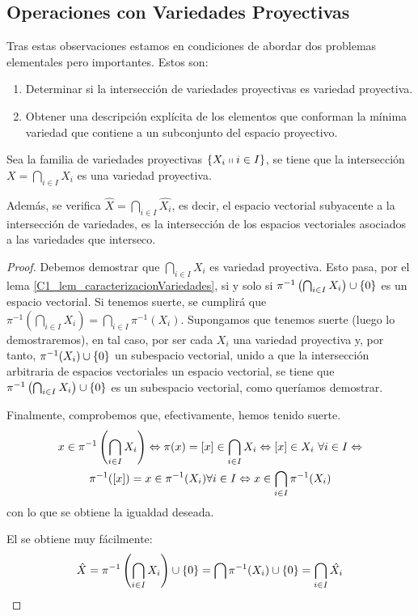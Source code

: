 \subsection{Operaciones con Variedades Proyectivas}
Tras estas observaciones estamos en condiciones de abordar dos problemas elementales pero importantes. Estos son:
\begin{enumerate}
	\item Determinar si la intersección de variedades proyectivas es variedad proyectiva.
	\item Obtener una descripción explícita de los elementos que conforman la mínima variedad que contiene a un subconjunto del espacio proyectivo.
\end{enumerate}
\begin{lem}
	\label{C1_lem_interseccionVariedades}
	Sea la familia de variedades proyectivas $\{X_i\shortparallel i\in I\}$, se tiene que la intersección $X=\bigcap_{i\in I}X_i$ es una variedad proyectiva.
	
	Además, se verifica $\hat{X}=\bigcap_{i\in I}\hat{X_i}$, es decir, el espacio vectorial subyacente a la intersección de variedades, es la intersección de los espacios vectoriales asociados a las variedades que interseco.
	
\end{lem}
\begin{proof}
	Debemos demostrar que $\bigcap_{i\in I}X_i$ es variedad proyectiva. Esto pasa, por el lema \ref{C1_lem_caracterizacionVariedades}, si y solo si $\pi^{-1}\left(\bigcap_{i\in I}X_i\right)\cup\{0\}$ es un espacio vectorial. Si tenemos suerte, se cumplirá que $\pi^{-1}\left(\bigcap_{i\in I}X_i\right)=\bigcap_{i\in I}\pi^{-1}(X_i)$. Supongamos que tenemos suerte (luego lo demostraremos), en tal caso, por ser cada $X_i$ una variedad proyectiva y, por tanto, $\pi^{-1}(X_i)\cup\{0\}$ un subespacio vectorial, unido a que la intersección arbitraria de espacios vectoriales un espacio vectorial, se tiene que $\pi^{-1}\left(\bigcap_{i\in I}X_i\right)\cup\{0\}$ es un subespacio vectorial, como queríamos demostrar.
	
	Finalmente, comprobemos que, efectivamente, hemos tenido suerte.
	\begin{multline*}
		x\in\pi^{-1}\left(\bigcap_{i\in I}X_i\right)\Leftrightarrow \pi(x)=\left [ x \right ]\in\bigcap_{i\in I}X_i\Leftrightarrow\left [ x \right ]\in X_i\ \forall i\in I\Leftrightarrow\\\pi^{-1}(\left [ x \right ])=x\in\pi^{-1}(X_i)\forall i\in I\Leftrightarrow x\in\bigcap_{i\in I}\pi^{-1}(X_i)
	\end{multline*}
	con lo que se obtiene la igualdad deseada.
	
	El  se obtiene muy fácilmente:\[\hat{X}=\pi^{-1}\left(\bigcap_{i\in I}X_i\right)\cup\{0\}=\bigcap\pi^{-1}(X_i)\cup\{0\}=\bigcap_{i\in I}\hat{X_i}\]
\end{proof}

